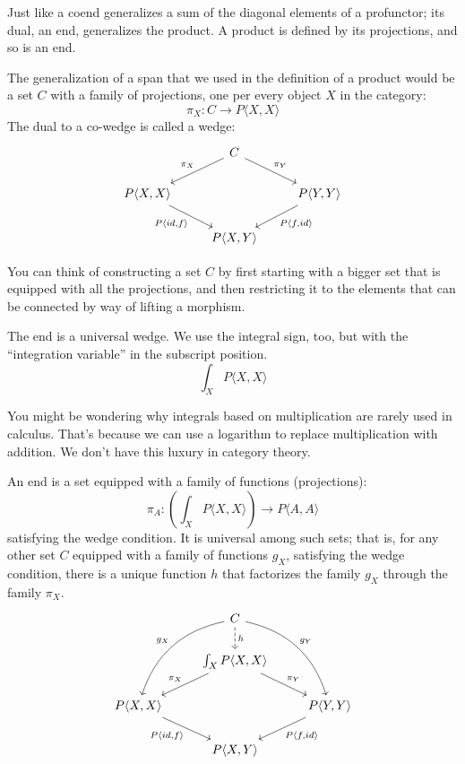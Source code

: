 \documentclass[DaoFP]{subfiles}
\begin{document}
Just like a coend generalizes a sum of the diagonal elements of a profunctor; its dual, an end, generalizes the product. A product is defined by its projections, and so is an end. 

The generalization of a span that we used in the definition of a product would be a set $C$ with a family of projections, one per every object $X$ in the category:
\[ \pi_X \colon C \to P \langle X, X \rangle \]
The dual to a co-wedge is called a wedge:
\[
 \begin{tikzcd}
 &C
 \arrow[ld, "\pi_X"']
 \arrow[rd, "\pi_Y"]
 \\
 P \langle X, X \rangle
 \arrow[dr, "{P \langle id, f \rangle}"']
 &&P \langle Y, Y \rangle
 \arrow[dl, "{P \langle f, id \rangle}"]
 \\
 & P \langle X, Y \rangle
 \end{tikzcd}
\]

You can think of constructing a set $C$ by first starting with a bigger set that is equipped with all the projections, and then restricting it to the elements that can be connected by way of lifting a morphism. 

The end is a universal wedge. We use the integral sign, too, but with the ``integration variable'' in the subscript position. 
\[ \int_X P \langle X, X \rangle \]

You might be wondering why integrals based on multiplication are rarely used in calculus. That's because we can use a logarithm to replace multiplication with addition. We don't have this luxury in category theory. 

An end is a set equipped with a family of functions (projections):
\[ \pi_A \colon \left( \int_X P \langle X, X \rangle \right) \to P \langle A, A \rangle \]
satisfying the wedge condition. It is universal among such sets; that is, for any other set $C$ equipped with a family of functions $g_X$, satisfying the wedge condition, there is a unique function $h$ that factorizes the family $g_X$ through the family $\pi_X$.
\[
 \begin{tikzcd}
 &C
 \arrow[ddl, bend right, "g_X"']
 \arrow[ddr, bend left, "g_Y"]
 \arrow[d, dashed, "h"]
 \\
 & \int_X P \langle X, X \rangle
 \arrow[ld, "\pi_X"']
 \arrow[rd, "\pi_Y"]
 \\
 P \langle X, X \rangle
 \arrow[dr, "{P \langle id, f \rangle}"']
 &&P \langle Y, Y \rangle
 \arrow[dl, "{P \langle f, id \rangle}"]
 \\
 & P \langle X, Y \rangle
 \end{tikzcd}
\]
\end{document}
